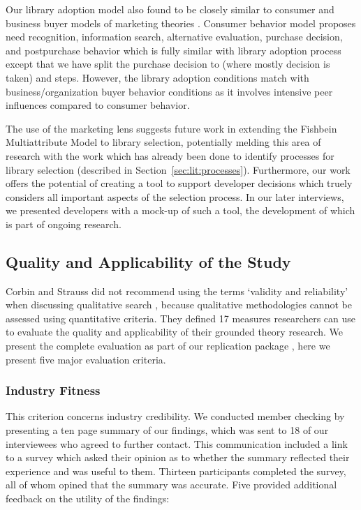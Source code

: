  Our library adoption model also found to be closely similar to consumer and business buyer models of marketing theories \cite{kotler2014principles}. Consumer behavior model proposes need recognition, information search, alternative evaluation, purchase decision, and postpurchase behavior which is fully similar with library adoption process except that we have split the purchase decision to  (where mostly decision is taken) and  steps. However, the library adoption conditions match with business/organization buyer behavior conditions as it involves intensive peer influences compared to consumer behavior.   

The use of the marketing lens suggests future work in extending the Fishbein Multiattribute Model \cite{fishbein1967attitude} to library selection, potentially melding this area of research with the work which has already been done to identify processes for library selection (described in Section~\ref{sec:lit:processes}). Furthermore, our work offers the potential of creating a tool to support developer decisions which truely considers all important aspects of the selection process. In our later interviews, we presented developers with a mock-up of such a tool, the development of which is part of ongoing research.




\subsection{Quality and Applicability of the Study}
Corbin and Strauss did not recommend using the terms `validity and reliability' when discussing qualitative search \cite{corbin2014gt}, because qualitative methodologies cannot be assessed using quantitative criteria. They defined 17 measures researchers can use to evaluate the quality and applicability of their grounded theory research. We present the complete evaluation as part of our replication package \cite{website:replication-package}, here we present five major evaluation criteria.

\subsubsection{Industry Fitness}
This criterion concerns industry credibility. We conducted member checking \cite{creswell2016qualitative} by presenting a ten page summary of our findings, which was sent to 18 of our interviewees who agreed to further contact. This communication included a link to a survey which asked their opinion as to whether the summary reflected their experience and was useful to them. Thirteen participants completed the survey, all of whom opined that the summary was accurate. Five provided additional feedback on the utility of the findings:

